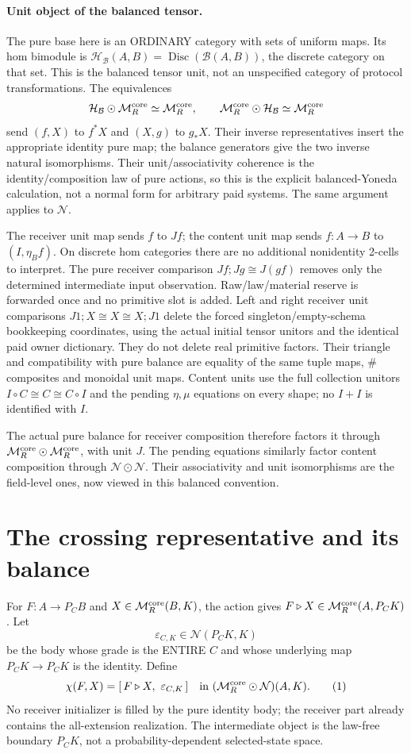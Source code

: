 \documentclass[11pt]{article}
\begin{document}
\paragraph{Unit object of the balanced tensor.}
The pure base here is an ORDINARY category with sets of uniform maps. Its hom bimodule is $\mathcal H_{\mathcal B}(A,B)=\operatorname{Disc}(\mathcal B(A,B))$, the discrete category on that set. This is the balanced tensor unit, not an unspecified category of protocol transformations. The equivalences
\[
 \mathcal H_{\mathcal B}\odot\mathcal M_R^{\rm core}\simeq\mathcal M_R^{\rm core},
 \qquad \mathcal M_R^{\rm core}\odot\mathcal H_{\mathcal B}\simeq\mathcal M_R^{\rm core}
\]
send $(f,X)$ to $f^*X$ and $(X,g)$ to $g_*X$. Their inverse representatives insert the appropriate identity pure map; the balance generators give the two inverse natural isomorphisms. Their unit/associativity coherence is the identity/composition law of pure actions, so this is the explicit balanced-Yoneda calculation, not a normal form for arbitrary paid systems. The same argument applies to $\mathcal N$.

The receiver unit map sends $f$ to $Jf$; the content unit map sends $f:A\to B$ to $(I,\eta_B f)$. On discrete hom categories there are no additional nonidentity 2-cells to interpret. The pure receiver comparison $Jf;Jg\cong J(gf)$ removes only the determined intermediate input observation. Raw/law/material reserve is forwarded once and no primitive slot is added. Left and right receiver unit comparisons $J1;X\cong X\cong X;J1$ delete the forced singleton/empty-schema bookkeeping coordinates, using the actual initial tensor unitors and the identical paid owner dictionary. They do not delete real primitive factors. Their triangle and compatibility with pure balance are equality of the same tuple maps, $\#$ composites and monoidal unit maps. Content units use the full collection unitors $I\circ C\cong C\cong C\circ I$ and the pending $\eta,\mu$ equations on every shape; no $I+I$ is identified with $I$.

The actual pure balance for receiver composition therefore factors it through $\mathcal M_R^{\rm core}\odot\mathcal M_R^{\rm core}$, with unit $J$. The pending equations similarly factor content composition through $\mathcal N\odot\mathcal N$. Their associativity and unit isomorphisms are the field-level ones, now viewed in this balanced convention.

\section{The crossing representative and its balance}
For $F:A\to P_CB$ and $X\in\mathcal M_R^{\rm core}(B,K)$, the action gives $F\triangleright X\in\mathcal M_R^{\rm core}(A,P_CK)$. Let
\[
 \varepsilon_{C,K}\in\mathcal N(P_CK,K)
\]
be the body whose grade is the ENTIRE $C$ and whose underlying map $P_CK\to P_CK$ is the identity. Define
\[
 \chi(F,X)=[\,F\triangleright X,\ \varepsilon_{C,K}\,]
       \quad\text{in }(\mathcal M_R^{\rm core}\odot\mathcal N)(A,K). \tag{1}
\]
No receiver initializer is filled by the pure identity body; the receiver part already contains the all-extension realization. The intermediate object is the law-free boundary $P_CK$, not a probability-dependent selected-state space.
\end{document}

